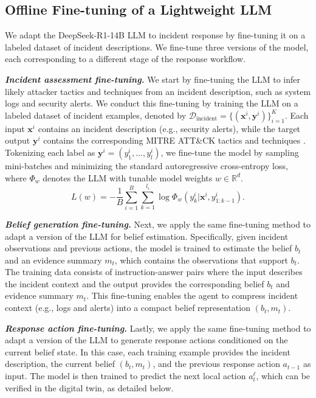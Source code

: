 \documentclass[runningheads,10pt]{llncs}
\begin{document}
\subsection{Offline Fine-tuning of a Lightweight LLM}
We adapt the DeepSeek-R1-14B \cite{deepseek-r1} LLM to incident response by fine-tuning it on a labeled dataset of incident descriptions. We fine-tune three versions of the model, each corresponding to a different stage of the response workflow.

\noindent\textit{\textbf{Incident assessment fine-tuning.}}  We start by fine-tuning the LLM to infer likely attacker tactics and techniques from an incident description, such as system logs and security alerts. We conduct this fine-tuning by training the LLM on a labeled dataset of incident examples, denoted by $\mathcal{D}_{\text{incident}}=\{(\mathbf{x}^i, \mathbf{y}^i)\}_{i=1}^K$. Each input $\mathbf{x}^i$ contains an incident description (e.g., security alerts), while the target output $\mathbf{y}^i$ contains the corresponding MITRE ATT\&CK tactics and techniques \cite{mitre-attack}. Tokenizing each label as $\mathbf{y}^i = (y_1^i, \hdots, y^i_l)$, we fine-tune the model by sampling mini-batches and minimizing the standard autoregressive cross-entropy loss, where $\Phi_w$ denotes the LLM with tunable model weights $w\in \mathbb R^d$.
\begin{equation}
\label{eq:loss}
L(w)=-\frac{1}{B}\sum_{i=1}^B\sum_{k=1}^{l_i} \log \Phi_{w}(y_k^i|\mathbf{x}^i, y_{1:k-1}^{i}).
\end{equation}
 

\noindent\textit{\textbf{Belief generation fine-tuning.}} Next, we apply the same fine-tuning method to adapt a version of the LLM for belief estimation. Specifically, given incident observations and previous actions, the model is trained to estimate the belief $b_t$ and an evidence summary $m_t$, which contains the observations that support $b_t$. The training data consists of instruction-answer pairs where the input describes the incident context and the output provides the corresponding belief $b_t$ and evidence summary $m_t$. This fine-tuning enables the agent to compress incident context (e.g., logs and alerts) into a compact belief representation $(b_t, m_t)$.

\noindent\textit{\textbf{Response action fine-tuning.}} Lastly, we apply the same fine-tuning method to adapt a version of the LLM to generate response actions conditioned on the current belief state. In this case, each training example provides the incident description, the current belief $(b_t, m_t)$, and the previous response action $a_{t-1}$ as input. The model is then trained to predict the next local action $a^{\ell}_t$, which can be verified in the digital twin, as detailed below.
\end{document}
